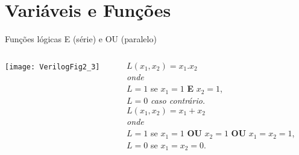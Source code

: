 


\subtitle{Funções e Circuitos Lógicos} %



\begin{frame}
	\titlepage
\end{frame} 



\section{Variáveis e Funções}



\begin{frame}{Funções lógicas E (série) e OU (paralelo)} 
    \begin{columns}
        \begin{column}{0.60\textwidth}
            \texttt{[image: VerilogFig2\_3]}
        \end{column}        
        \begin{column}{0.40\textwidth}
            $L(x_1,x_2) = x_1.x_2$ \\
            \textit{onde} \\
            $L = 1$ se $x_1 = 1$ \textbf{E} $x_2 = 1$, \\
            $L = 0$ \textit{caso contrário.} \\
            \vspace{1cm}
            $L(x_1,x_2) = x_1 + x_2$ \\
            \textit{onde} \\
            $L = 1$ se $x_1 = 1$ \textbf{OU} $x_2 = 1$ \textbf{OU} $x_1 = x_2 = 1$, \\
            $L = 0$ se $x_1 = x_2 = 0$. \\
            \vspace{1cm}
        \end{column}
    \end{columns}
\end{frame}

